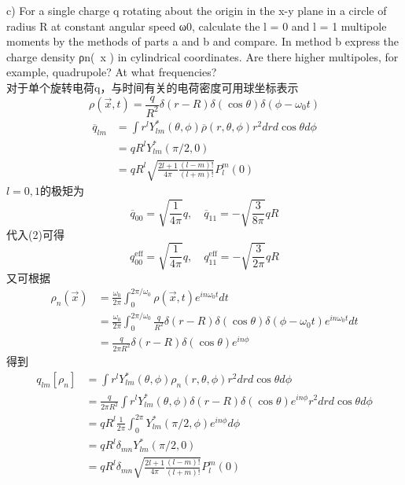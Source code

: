 \documentclass[UTF8,9pt]{ctexart}
\begin{document}
 c) For a single charge q rotating about the origin in the x-y plane in a circle of
 radius R at constant angular speed ω0, calculate the l = 0 and l = 1 multipole
 moments by the methods of parts a and b and compare. In method b express the
 charge density ρn(~x ) in cylindrical coordinates. Are there higher multipoles, for
 example, quadrupole? At what frequencies?\\
 对于单个旋转电荷q，与时间有关的电荷密度可用球坐标表示$$ 
 \rho(\vec{x}, t)=\frac{q}{R^{2}} \delta(r-R) \delta(\cos \theta) \delta\left(\phi-\omega_{0} t\right)
  $$\begin{equation}
\begin{aligned} \overline{q}_{l m} &=\int r^{l} Y_{l m}^{*}(\theta, \phi) \overline{\rho}(r, \theta, \phi) r^{2} d r d \cos \theta d \phi \\ &=q R^{l} Y_{l m}^{*}(\pi / 2,0) \\ &=q R^{l} \sqrt{\frac{2 l+1}{4 \pi} \frac{(l-m) !}{(l+m) !}} P_{l}^{m}(0) \end{aligned}
\end{equation}
 $l=0,1$的极矩为$$ 
 \overline{q}_{00}=\sqrt{\frac{1}{4 \pi}} q, \quad \overline{q}_{11}=-\sqrt{\frac{3}{8 \pi}} q R
  $$代入(2)可得
  $$ 
q_{00}^{\mathrm{eff}}=\sqrt{\frac{1}{4 \pi}} q, \quad q_{11}^{\mathrm{eff}}=-\sqrt{\frac{3}{2 \pi}} q R
 $$
 又可根据$$ 
\begin{aligned} \rho_{n}(\vec{x}) &=\frac{\omega_{0}}{2 \pi} \int_{0}^{2 \pi / \omega_{0}} \rho(\vec{x}, t) e^{i n \omega_{0} t} d t \\ &=\frac{\omega_{0}}{2 \pi} \int_{0}^{2 \pi / \omega_{0}} \frac{q}{R^{2}} \delta(r-R) \delta(\cos \theta) \delta\left(\phi-\omega_{0} t\right) e^{i n \omega_{0} t} d t \\ &=\frac{q}{2 \pi R^{2}} \delta(r-R) \delta(\cos \theta) e^{i n \phi} \end{aligned}
 $$
 得到$$ 
\begin{aligned} q_{l m}\left[\rho_{n}\right] &=\int r^{l} Y_{l m}^{*}(\theta, \phi) \rho_{n}(r, \theta, \phi) r^{2} d r d \cos \theta d \phi \\ &=\frac{q}{2 \pi R^{2}} \int r^{l} Y_{l m}^{*}(\theta, \phi) \delta(r-R) \delta(\cos \theta) e^{i n \phi} r^{2} d r d \cos \theta d \phi \\ &=q R^{l} \frac{1}{2 \pi} \int_{0}^{2 \pi} Y_{l m}^{*}(\pi / 2, \phi) e^{i n \phi} d \phi \\ &=q R^{l} \delta_{m n} Y_{l m}^{*}(\pi / 2,0) \\ &=q R^{l} \delta_{m n} \sqrt{\frac{2 l+1}{4 \pi} \frac{(l-m) !}{(l+m) !}} P_{l}^{m}(0) \end{aligned}
 $$
\end{document}
